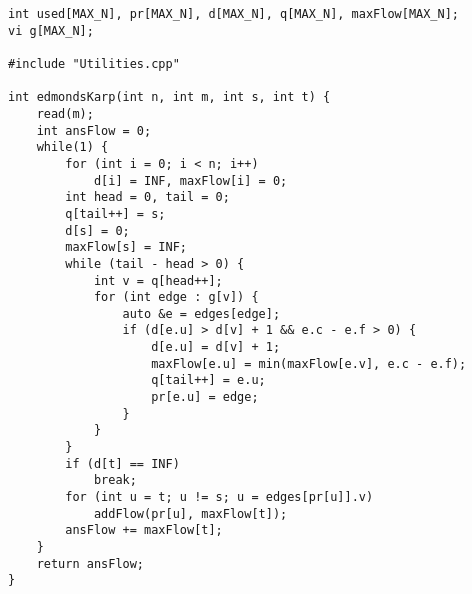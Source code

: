 \begin{verbatim}
int used[MAX_N], pr[MAX_N], d[MAX_N], q[MAX_N], maxFlow[MAX_N];
vi g[MAX_N];

#include "Utilities.cpp"

int edmondsKarp(int n, int m, int s, int t) {
	read(m);
	int ansFlow = 0;
	while(1) {
		for (int i = 0; i < n; i++)
			d[i] = INF, maxFlow[i] = 0;
		int head = 0, tail = 0;
		q[tail++] = s;
		d[s] = 0;
		maxFlow[s] = INF;
		while (tail - head > 0) {
			int v = q[head++];
			for (int edge : g[v]) {
				auto &e = edges[edge];
				if (d[e.u] > d[v] + 1 && e.c - e.f > 0) {
					d[e.u] = d[v] + 1;
					maxFlow[e.u] = min(maxFlow[e.v], e.c - e.f);
					q[tail++] = e.u;
					pr[e.u] = edge;
				}
			}
		}
		if (d[t] == INF)
			break;
		for (int u = t; u != s; u = edges[pr[u]].v)
			addFlow(pr[u], maxFlow[t]);
		ansFlow += maxFlow[t];
	}
	return ansFlow;
}
\end{verbatim}
